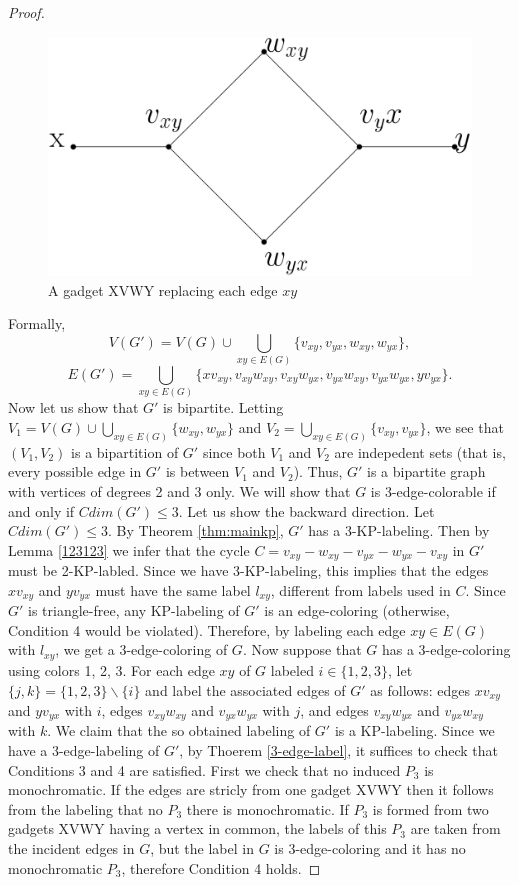 \documentclass[12pt,a4paper,titlepage,openany]{report}
\begin{document}
\begin{proof}
\begin{figure}[h]
\begin{center}
\includegraphics[width=0.6\linewidth]{figures/gadget.png}
\end{center}
\caption{A gadget XVWY replacing each edge $xy$}\label{gadget}
\end{figure}
Formally,
$$V(G')= V(G)\cup
\bigcup_{xy\in E(G)} \{v_{xy}, v_{yx}, w_{xy}, w_{yx}\},$$
$$E(G')=\bigcup_{xy\in E(G)} \{xv_{xy}, v_{xy}w_{xy}, v_{xy}w_{yx}, v_{yx}w_{xy},v_{yx}w_{yx}, yv_{yx}\}.$$
Now let us show that $G'$ is bipartite. Letting $V_1=V(G)\cup
\bigcup_{xy\in E(G)} \{w_{xy},w_{yx}\}$ and $V_2=\bigcup_{xy\in E(G)} \{v_{xy},v_{yx}\}$, we see that $(V_1, V_2)$ is a bipartition of $G'$ since both $V_1$ and $V_2$ are indepedent sets (that is, every possible edge in $G'$ is between $V_1$ and $V_2$). Thus, $G'$ is a bipartite graph with vertices of degrees 2 and 3 only. We will show that $G$ is 3-edge-colorable if and only if $Cdim(G') 
\leq 3$.\newline
Let us show the backward direction. Let $Cdim(G')\leq 3$. By Theorem \ref{thm:mainkp}, $G'$ has a 3-KP-labeling. Then by Lemma \ref{123123} we infer that the cycle $C=v_{xy}-w_{xy}-v_{yx}-w_{yx}-v_{xy}$ in $G'$ must be 2-KP-labled. Since we have 3-KP-labeling, this implies that the edges $xv_{xy}$ and $yv_{yx}$ must have the same label $l_{xy}$, different from labels used in $C$. Since $G'$ is triangle-free, any KP-labeling of $G'$ is an edge-coloring (otherwise, Condition 4 would be violated). Therefore, by labeling each edge $xy \in E(G)$ with $l_{xy}$, we get a 3-edge-coloring of $G$.\newline
Now suppose that $G$ has a 3-edge-coloring using colors 1, 2, 3. For each edge $xy$ of $G$ labeled $i \in \{1, 2, 3\}$, let $\{j, k\} = \{1, 2, 3\} \backslash \{i\}$ and label the associated edges of $G'$ as follows: edges $xv_{xy}$ and $yv_{yx}$ with $i$, edges $v_{xy} w_{xy}$ and $v_{yx} w_{yx}$ with $j$, and edges $v_{xy} w_{yx}$ and $v_{yx} w_{xy}$ with $k$. We claim that the so obtained labeling of $G'$ is a KP-labeling. Since we have a 3-edge-labeling of $G'$, by Thoerem \ref{3-edge-label}, it suffices to check that Conditions 3 and 4 are satisfied. First we check that no induced $P_3$ is monochromatic. If the edges are stricly from one gadget XVWY then it follows from the labeling that no $P_3$ there is monochromatic. If $P_3$ is formed from two gadgets XVWY having a vertex in common, the labels of this $P_3$ are taken from the incident edges in $G$, but the label in $G$ is 3-edge-coloring and it has no monochromatic $P_3$, therefore Condition 4 holds.

\end{proof}
\end{document}
